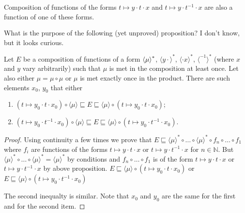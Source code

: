 \begin{obvious}
Composition of functions of the forms $t \mapsto y \cdot t \cdot x$ and $t
\mapsto y \cdot t^{- 1} \cdot x$ are also a function of one of these
forms.
\end{obvious}

What is the purpose of the following (yet unproved) proposition? I don't know, but it looks curious.

\begin{prop}
  Let $E$ be a composition of functions of a form
  $\left\langle \mu\right\rangle ^{\ast}$, $\langle y \cdot
  \rangle^{\ast}$, $\langle \cdot x \rangle^{\ast}$, $\langle^{- 1}
  \rangle^{\ast}$ (where $x$ and $y$ vary arbitrarily)
  such that $\mu$ is met in the composition at least once.
  Let also either $\mu = \mu \circ \mu$ or $\mu$ is met exactly once in the product.
  There are such elements $x_0$, $y_0$ that either
  \begin{enumerate}
  \item $(t \mapsto y_0 \cdot t \cdot x_0) \circ \langle \mu \rangle
  \sqsubseteq E \sqsubseteq \langle \mu \rangle \circ (t \mapsto y_0 \cdot t
  \cdot x_0)$;
  
  \item  $(t \mapsto y_0 \cdot t^{- 1} \cdot x_0) \circ \langle \mu \rangle
  \sqsubseteq E \sqsubseteq \langle \mu \rangle \circ (t \mapsto y_0 \cdot
  t^{- 1} \cdot x_0)$.
  \end{enumerate}
\end{prop}

\begin{proof}
  Using continuity a few times we prove that $E \sqsubseteq \langle \mu
  \rangle^{\ast} \circ \ldots \circ \langle \mu \rangle^{\ast} \circ f_n \circ
  \ldots \circ f_1$ where $f_i$ are functions of the forms $t \mapsto y \cdot
  t \cdot x$ or $t \mapsto y \cdot t^{- 1} \cdot x$ for $n \in \mathbb{N}$.
  But $\langle \mu \rangle^{\ast} \circ \ldots \circ \langle \mu
  \rangle^{\ast} = \langle \mu \rangle^{\ast}$ by conditions and $f_n \circ
  \ldots \circ f_1$ is of the form $t \mapsto y \cdot t \cdot x$ or $t \mapsto
  y \cdot t^{- 1} \cdot x$ by above proposition. $E \sqsubseteq \langle \mu
  \rangle \circ (t \mapsto y_0 \cdot t \cdot x_0)$ or $E \sqsubseteq \langle
  \mu \rangle \circ (t \mapsto y_0 \cdot t^{- 1} \cdot x_0)$
  
  The second inequalty is similar. Note that $x_0$ and $y_0$ are the same for
  the first and for the second item.
\end{proof}

